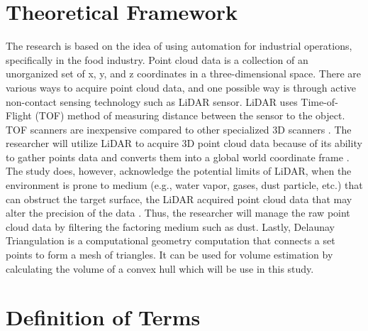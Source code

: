 \section{Theoretical Framework}
\label{intro:sec:Theoretical Framework}
The research is based on the idea of using automation for industrial operations, specifically in the food industry. Point cloud data is a collection of an unorganized set of x, y, and z coordinates in a three-dimensional space. There are various ways to acquire point cloud data, and one possible way is through active non-contact sensing technology such as LiDAR sensor. LiDAR uses Time-of-Flight (TOF) method of measuring distance between the sensor to the object. TOF scanners are inexpensive compared to other specialized 3D scanners \citep{chua2017}. The researcher will utilize LiDAR to acquire 3D point cloud data because of its ability to gather points data and converts them into a global world coordinate frame \citep{bi2021}. The study does, however, acknowledge the potential limits of LiDAR, when the environment is prone to medium (e.g., water vapor, gases, dust particle, etc.) that can obstruct the target surface, the LiDAR acquired point cloud data that may alter the precision of the data \citep{chua2017}. Thus, the researcher will manage the raw point cloud data by filtering the factoring medium such as dust. Lastly, Delaunay Triangulation is a computational geometry computation that connects a set points to form a mesh of triangles. It can be used for volume estimation by calculating the volume of a convex hull which will be use in this study.

\section{Definition of Terms}
\label{intro:sec:Definition of Terms}

